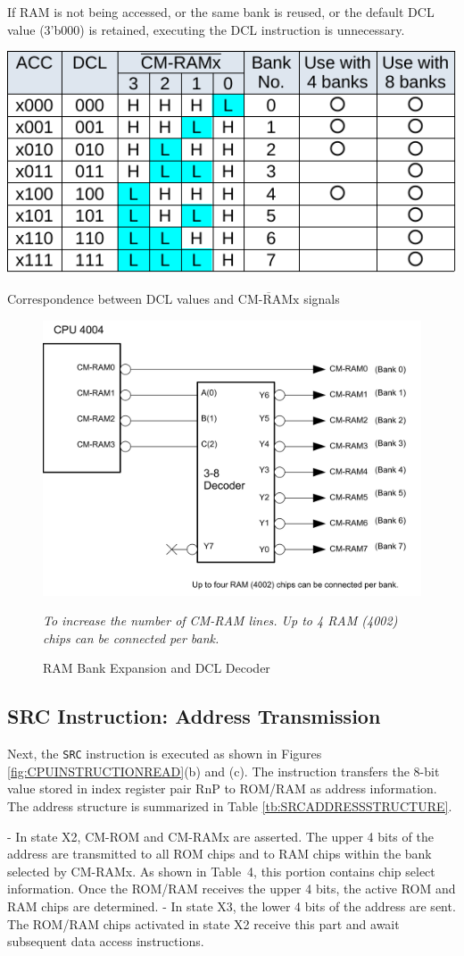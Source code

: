 If RAM is not being accessed, or the same bank is reused, or the default DCL value (3'b000) is retained, executing the DCL instruction is unnecessary.

\begin{table}[htbp]
    \includegraphics[width=0.5\columnwidth]{./Table/DCLandCMRAM.pdf}
    \caption{Correspondence between DCL values and $\overline{\text{CM-RAMx}}$ signals}
    \label{tb:DCLANDCMRAM}
\end{table}
\begin{figure}[htbp]
    \includegraphics[width=0.5\columnwidth]{./Figure/DCLDecoder.png}
    \caption{RAM Bank Expansion and DCL Decoder}
    \textit{To increase the number of CM-RAM lines. Up to 4 RAM (4002) chips can be connected per bank.}
    \label{fig:DCLDECODER}
\end{figure}

\subsection{SRC Instruction: Address Transmission}
Next, the \texttt{SRC} instruction is executed as shown in Figures \ref{fig:CPUINSTRUCTIONREAD}(b) and (c). The instruction transfers the 8-bit value stored in index register pair RnP to ROM/RAM as address information. The address structure is summarized in Table \ref{tb:SRCADDRESSSTRUCTURE}.

- In state X2, CM-ROM and CM-RAMx are asserted. The upper 4 bits of the address are transmitted to all ROM chips and to RAM chips within the bank selected by CM-RAMx. As shown in Table~4, this portion contains chip select information. Once the ROM/RAM receives the upper 4 bits, the active ROM and RAM chips are determined.
- In state X3, the lower 4 bits of the address are sent. The ROM/RAM chips activated in state X2 receive this part and await subsequent data access instructions.

